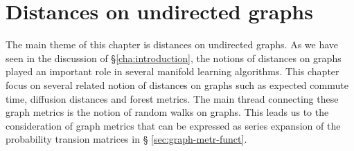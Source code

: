 \chapter{Distances on undirected graphs}
\label{cha:dist-undir-graphs}
The main theme of this chapter is distances on undirected graphs. As
we have seen in the discussion of \S \ref{cha:introduction}, the
notions of distances on graphs played an important role in several
manifold learning algorithms. This chapter focus on several related
notion of distances on graphs such as expected commute time, diffusion
distances and forest metrics. The main thread connecting these graph
metrics is the notion of random walks on graphs. This leads us to
the consideration of graph metrics that can be expressed as series
expansion of the probability transion matrices in \S
\ref{sec:graph-metr-funct}. \\ \\
%
%  
